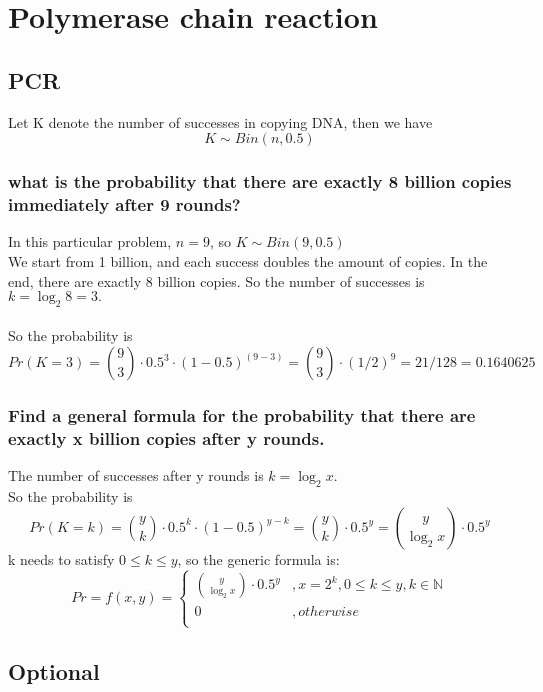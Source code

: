 \documentclass{article}
\author{Ziyang Jin}
\date{February 2018}
\begin{document}
\section{Polymerase chain reaction}

\subsection{PCR}
Let K denote the number of successes in copying DNA, then we have 
\[
K \sim Bin(n, 0.5)
\]

\subsubsection{what is the probability that there are exactly 8 billion copies immediately after 9 rounds?}

In this particular problem, \( n = 9 \), so \( K \sim Bin(9, 0.5)\)\\
We start from 1 billion, and each success doubles the amount of copies. In the end, there are exactly 8 billion copies. So the number of successes is \( k = {\log_2 8} = 3. \) \\
\\
So the probability is \\
\[
Pr(K = 3) = {9 \choose 3} \cdot 0.5^3 \cdot (1 - 0.5)^{(9-3)} = {9 \choose 3} \cdot (1/2)^9 = 21/128 = 0.1640625
\]

\subsubsection{Find a general formula for the probability that there are exactly x billion copies after y rounds.}

The number of successes after y rounds is \( k = {\log_2 x} \). \\
So the probability is
\[
Pr(K = k) = {y \choose k} \cdot 0.5^k \cdot (1 - 0.5)^{y-k} = {y \choose k} \cdot 0.5^y = 
{y \choose {\log_2 x}} \cdot 0.5^y
\]
k needs to satisfy \( 0 \leq k \leq y\), so the generic formula is: \\
\[
Pr = f(x,y) = \left\{
\begin{array}{ll}
      {y \choose {\log_2 x}} \cdot 0.5^y & , x = 2^k, 0\leq k \leq y, k \in \mathbb{N} \\
      0 & , otherwise\\
\end{array} 
\right.
\]

\subsection{Optional}
\end{document}
